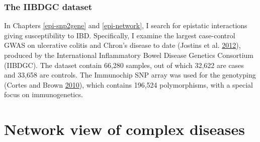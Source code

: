 \documentclass[
  11pt,
]{env/yjiao}
\begin{document}
\hypertarget{iibdgc-dataset}{%
\subsubsection{The IIBDGC dataset}\label{iibdgc-dataset}}

In Chapters \ref{epi-snp2gene} and \ref{epi-network}, I search for epistatic interactions giving susceptibility to IBD. Specifically, I examine the largest case-control GWAS on ulcerative colitis and Chron's disease to date (Jostins et al. \protect\hyperlink{ref-jostins_hostmicrobe_2012}{2012}), produced by the International Inflammatory Bowel Disease Genetics Consortium (IIBDGC). The dataset contain 66,280 samples, out of which 32,622 are cases and 33,658 are controls. The Immunochip SNP array was used for the genotyping (Cortes and Brown \protect\hyperlink{ref-cortes_promise_2010}{2010}), which contains 196,524 polymorphisms, with a special focus on immunogenetics.

\hypertarget{network-view-of-complex-diseases}{%
\section{Network view of complex diseases}\label{network-view-of-complex-diseases}}
\end{document}
